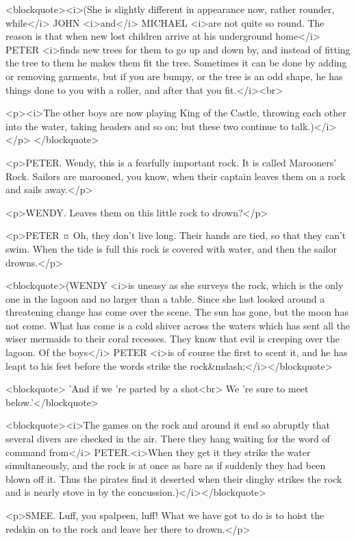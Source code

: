 <blockquote><i>(She is slightly different in appearance now, rather rounder, while</i> JOHN <i>and</i> MICHAEL <i>are not quite so round. The reason is that when new lost children arrive at his underground home</i> PETER <i>finds new trees for them to go up and down by, and instead of fitting the tree to them he makes them fit the tree. Sometimes it can be done by adding or removing garments, but if you are bumpy, or the tree is an odd shape, he has things done to you with a roller, and after that you fit.</i><br> 

<p><i>The other boys are now playing King of the Castle, throwing each other into the water, taking headers and so on; but these two continue to talk.)</i></p> </blockquote>

<p>PETER. Wendy, this is a fearfully important rock. It is called Marooners' Rock. Sailors are marooned, you know, when their captain leaves them on a rock and sails away.</p>

<p>WENDY. Leaves them on this little rock to drown?</p>

<p>PETER ¤
Oh, they don't live long. Their hands are tied, so that they can't swim. When the tide is full this rock is covered with water, and then the sailor drowns.</p>

<blockquote>(WENDY <i>is uneasy as she surveys the rock, which is the only one in the lagoon and no larger than a table. Since she last looked around a threatening change has come over the scene. The sun has gone, but the moon has not come. What has come is a cold shiver across the waters which has sent all the wiser mermaids to their coral recesses. They know that evil is creeping over the lagoon. Of the boys</i> PETER <i>is of course the first to scent it, and he has leapt to his feet before the words strike the rock&mdash;</i></blockquote>

<blockquote> 'And if we 're parted by a shot<br> We 're sure to meet below.'</blockquote>

<blockquote><i>The games on the rock and around it end so abruptly that several divers are checked in the air. There they hang waiting for the word of command from</i> PETER.<i>When they get it they strike the water simultaneously, and the rock is at once as bare as if suddenly they had been blown off it. Thus the pirates find it deserted when their dinghy strikes the rock and is nearly stove in by the concussion.)</i></blockquote>

<p>SMEE. Luff, you spalpeen, luff!
What we have got to do is to hoist the redskin on to the rock and leave her there to drown.</p>

